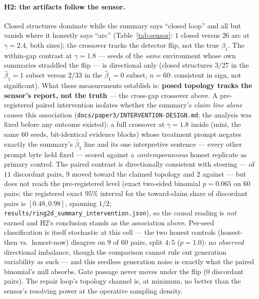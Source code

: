 \documentclass[11pt]{article}
\theoremstyle{remark}
\begin{document}
\paragraph{H2: the artifacts follow the sensor.} Closed structures
dominate while the summary says ``closed loop'' and all but vanish
where it honestly says ``arc'' (Table~\ref{tab:sensor}: $1$ closed versus
$26$ arc at $\gamma = 2.4$, both sizes); the crossover tracks the detector
flip, not the true $\beta_1$. The within-gap contrast at $\gamma = 1.8$
--- seeds of the \emph{same} environment whose own summaries straddled the
flip --- is directional only (closed structures $3/27$ in the
$\hat\beta_1 = 1$ subset versus $2/33$ in the $\hat\beta_1 = 0$ subset,
$n = 60$: consistent in sign, not significant). What these measurements
establish is: \textbf{posed topology tracks the sensor's report, not the
truth} --- the cross-gap crossover above. A pre-registered paired
intervention isolates whether the summary's \emph{claim line alone}
causes this association
(\texttt{docs/paper3/INTERVENTION-DESIGN.md}; the analysis was fixed
before any outcome existed): a full crossover at $\gamma = 1.8$ inside
(mini, the same $60$ seeds, bit-identical evidence blocks) whose
treatment prompt negates exactly the summary's $\hat\beta_1$ line and its
one interpretive sentence --- every other prompt byte held fixed ---
scored against a \emph{contemporaneous} honest replicate as primary
control. The paired contrast is directionally consistent with steering
--- of $11$ discordant pairs, $9$ moved toward the claimed topology and
$2$ against --- but does not reach the pre-registered level (exact
two-sided binomial $p = 0.065$ on $60$ pairs; the registered exact
$95\%$ interval for the toward-claim share of discordant pairs is
$[0.48, 0.98]$, spanning $1/2$;
\texttt{results/ring2d\_summary\_intervention.json}), so the causal
reading is \emph{not} earned and H2's conclusion stands as the
association above. Per-seed classification is itself stochastic at this
cell --- the two honest controls (honest-then vs.\ honest-now) disagree
on $9$ of $60$ pairs, split $4{:}5$ ($p = 1.0$): no \emph{observed}
directional imbalance, though the comparison cannot rule out
generation variability as such --- and this seedless generation noise is
exactly what the paired binomial's null absorbs. Gate passage never
moves under the flip ($0$ discordant pairs).
The repair loop's topology channel is, at minimum, no better than the
sensor's resolving power at the operative sampling density.
\end{document}
